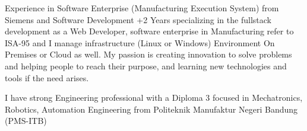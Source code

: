 

\begin{cvparagraph}

Experience in Software Enterprise (Manufacturing Execution System) from Siemens and Software Development +2 Years specializing in the fullstack development as a Web Developer, software enterprise in Manufacturing refer to ISA-95 and I manage infrastructure (Linux or Windows) Environment On Premises or Cloud as well.
My passion is creating innovation to solve problems and helping people to reach their purpose, and learning new technologies and tools if the need arises.

I have strong Engineering professional with a Diploma 3 focused in Mechatronics, Robotics, Automation Engineering from Politeknik Manufaktur Negeri Bandung (PMS-ITB)
\end{cvparagraph}
